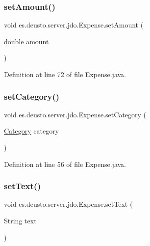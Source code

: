 \subsubsection{\texorpdfstring{set\+Amount()}{setAmount()}}
{\footnotesize\ttfamily void es.\+deusto.\+server.\+jdo.\+Expense.\+set\+Amount (\begin{DoxyParamCaption}\item[{double}]{amount }\end{DoxyParamCaption})}



Definition at line 72 of file Expense.\+java.

\mbox{\label{classes_1_1deusto_1_1server_1_1jdo_1_1_expense_aff380f7cb2ae1691daaef89fbd547974}} 
\subsubsection{\texorpdfstring{set\+Category()}{setCategory()}}
{\footnotesize\ttfamily void es.\+deusto.\+server.\+jdo.\+Expense.\+set\+Category (\begin{DoxyParamCaption}\item[{\hyperlink{enumes_1_1deusto_1_1server_1_1jdo_1_1_category}{Category}}]{category }\end{DoxyParamCaption})}



Definition at line 56 of file Expense.\+java.

\mbox{\label{classes_1_1deusto_1_1server_1_1jdo_1_1_expense_aff1a35b5f6a893ddfafaa2eda21534d2}} 
\subsubsection{\texorpdfstring{set\+Text()}{setText()}}
{\footnotesize\ttfamily void es.\+deusto.\+server.\+jdo.\+Expense.\+set\+Text (\begin{DoxyParamCaption}\item[{String}]{text }\end{DoxyParamCaption})}



